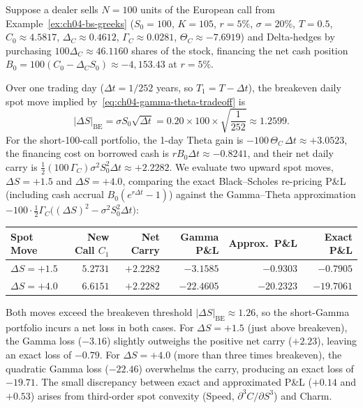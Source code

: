 \begin{example}
    \label{ex:ch04-delta-hedged-pnl}
    Suppose a dealer sells $N = 100$ units of the European call from Example~\ref{ex:ch04-bs-greeks} ($S_0 = 100$, $K = 105$, $r = 5\%$, $\sigma = 20\%$, $T = 0.5$, $C_0 \approx 4.5817$, $\Delta_C \approx 0.4612$, $\Gamma_C \approx 0.0281$, $\Theta_C \approx -7.6919$) and Delta-hedges by purchasing $100\Delta_C \approx 46.1160$ shares of the stock, financing the net cash position $B_0 = 100(C_0 - \Delta_C S_0) \approx -4{,}153.43$ at $r = 5\%$.

    Over one trading day ($\Delta t = 1/252$ years, so $T_1 = T - \Delta t$), the breakeven daily spot move implied by~\eqref{eq:ch04-gamma-theta-tradeoff} is
    \[
        |\Delta S|_{\mathrm{BE}} = \sigma S_0 \sqrt{\Delta t} = 0.20 \times 100 \times \sqrt{\frac{1}{252}} \approx 1.2599.
    \]
    For the short-100-call portfolio, the 1-day Theta gain is $-100\,\Theta_C\,\Delta t \approx +3.0523$, the financing cost on borrowed cash is $r B_0 \Delta t \approx -0.8241$, and their net daily carry is $\frac{1}{2}(100\,\Gamma_C)\sigma^2 S_0^2 \Delta t \approx +2.2282$. We evaluate two upward spot moves, $\Delta S = +1.5$ and $\Delta S = +4.0$, comparing the exact Black--Scholes re-pricing P\&L (including cash accrual $B_0(e^{r\Delta t} - 1)$) against the Gamma--Theta approximation $-100\cdot\frac{1}{2}\Gamma_C\bigl((\Delta S)^2 - \sigma^2 S_0^2 \Delta t\bigr)$:
    \begin{center}
        \begin{tabular}{lrrrrr}
            \toprule
            \textbf{Spot Move} & \textbf{New Call $C_1$} & \textbf{Net Carry} & \textbf{Gamma P\&L} & \textbf{Approx.\ P\&L} & \textbf{Exact P\&L} \\
            \midrule
            $\Delta S = +1.5$ & $5.2731$ & $+2.2282$ & $-3.1585$ & $-0.9303$ & $-0.7905$ \\
            $\Delta S = +4.0$ & $6.6151$ & $+2.2282$ & $-22.4605$ & $-20.2323$ & $-19.7061$ \\
            \bottomrule
        \end{tabular}
    \end{center}
    Both moves exceed the breakeven threshold $|\Delta S|_{\mathrm{BE}} \approx 1.26$, so the short-Gamma portfolio incurs a net loss in both cases. For $\Delta S = +1.5$ (just above breakeven), the Gamma loss ($-3.16$) slightly outweighs the positive net carry ($+2.23$), leaving an exact loss of $-0.79$. For $\Delta S = +4.0$ (more than three times breakeven), the quadratic Gamma loss ($-22.46$) overwhelms the carry, producing an exact loss of $-19.71$. The small discrepancy between exact and approximated P\&L ($+0.14$ and $+0.53$) arises from third-order spot convexity (Speed, $\partial^3 C / \partial S^3$) and Charm.
\end{example}

